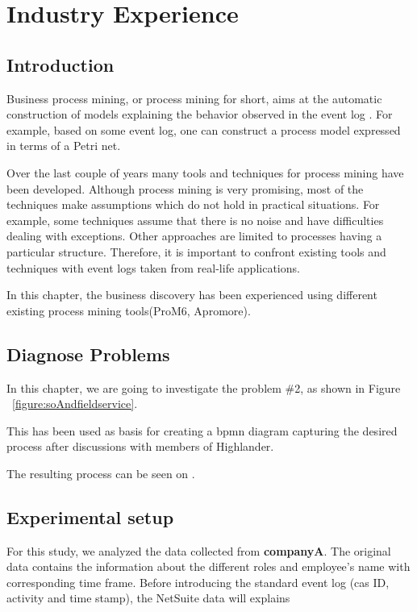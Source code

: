 \chapter{Industry Experience}
\label{chap:industryExperience}

\section{Introduction}
\label{sec:industryExperience-Introduction}

Business process mining, or process mining for short, aims at the automatic construction of models explaining the behavior observed in the event log \cite{maita2015process}. For example, based on some event log, one can construct a process model expressed in terms of a Petri net.

Over the last couple of years many tools and techniques for process mining have been developed\cite{rozinat2006decision}. Although process mining is very promising, most of the techniques make assumptions which do not hold in practical situations. For example, some techniques assume that there is no noise and have difficulties dealing with exceptions. Other approaches are limited to processes having a particular structure. Therefore, it is important to confront existing tools and techniques with event logs taken from real-life applications.

In this chapter, the business discovery has been experienced using different existing process mining tools(ProM6, Apromore).

\section{Diagnose Problems}

In this chapter, we are going to investigate the problem \#2, as shown in Figure ~\ref{figure:soAndfieldservice}.

This has been used as basis for creating a bpmn diagram capturing the desired process after discussions with members of Highlander.

The resulting process can be seen on .


\section{Experimental setup}
\label{sec:industryExperience-Methodology}
For this study, we analyzed the data collected from  \textbf{companyA}. 
The original data contains the information about the different roles and employee's name with corresponding time frame. Before introducing the  standard event log (cas ID, activity and time stamp), the NetSuite data will explains


